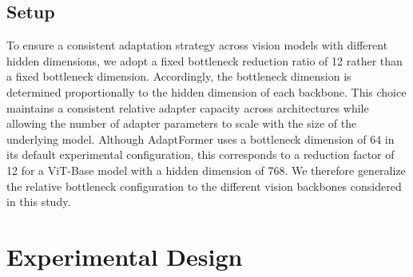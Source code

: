 \documentclass[report.tex]{subfiles}
\begin{document}
    \subsection{Setup}

    To ensure a consistent adaptation strategy across vision models with different hidden dimensions, we adopt a fixed bottleneck reduction ratio of 12 rather than a fixed bottleneck dimension. Accordingly, the bottleneck dimension is determined proportionally to the hidden dimension of each backbone. This choice maintains a consistent relative adapter capacity across architectures while allowing the number of adapter parameters to scale with the size of the underlying model. Although AdaptFormer uses a bottleneck dimension of 64 in its default experimental configuration, this corresponds to a reduction factor of 12 for a ViT-Base model with a hidden dimension of 768. We therefore generalize the relative bottleneck configuration to the different vision backbones considered in this study.

    \section{Experimental Design}
\end{document}
